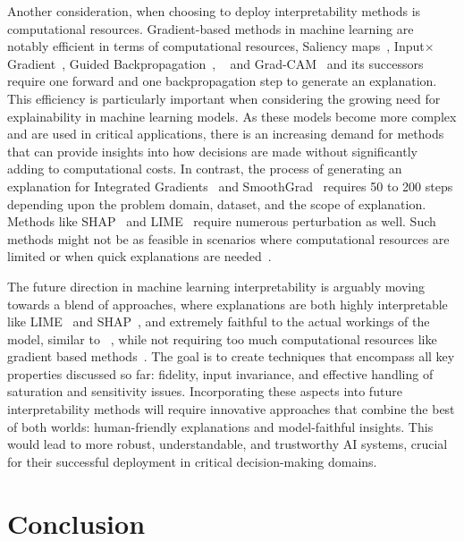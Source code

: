 Another consideration, when choosing to deploy interpretability methods is computational resources. Gradient-based methods in machine learning are notably efficient in terms of computational resources, Saliency maps~\cite{SimonyanVZ13}, Input$\times$Gradient~\cite{SimonyanVZ13}, Guided Backpropagation~\cite{SpringenbergDBR14}, \LRP~\cite{bach2015pixel} and  Grad-CAM~\cite{SelvarajuCDVPB20} and its successors~\cite{SelvarajuCDVPB20, ChattopadhyaySH18, abs-1908-01224, SmilkovTKVW17} require one forward and one backpropagation step to generate an explanation. This efficiency is particularly important when considering the growing need for explainability in machine learning models. As these models become more complex and are used in critical applications, there is an increasing demand for methods that can provide insights into how decisions are made without significantly adding to computational costs. In contrast, the process of generating an explanation for Integrated Gradients~\cite{SundararajanTY17} and SmoothGrad~\cite{SmilkovTKVW17} requires 50 to 200 steps depending upon the problem domain, dataset, and the scope of explanation. Methods like SHAP~\cite{LundbergL17} and LIME~\cite{Ribeiro0G16} require numerous perturbation as well. Such methods might not be as feasible in scenarios where computational resources are limited or when quick explanations are needed~\cite{GhorbaniAZ19}.


The future direction in machine learning interpretability is arguably moving towards a blend of approaches, where explanations are both highly interpretable like LIME~\cite{bach2015pixel} and SHAP~\cite{LundbergL17}, and extremely faithful to the actual workings of the model, similar to \LRP~\cite{bach2015pixel}, while not requiring too much computational resources like gradient based methods~\cite{SimonyanVZ13, SimonyanVZ13, SpringenbergDBR14, bach2015pixel, SelvarajuCDVPB20, SelvarajuCDVPB20, ChattopadhyaySH18, abs-1908-01224, SmilkovTKVW17}. The goal is to create techniques that encompass all key properties discussed so far: fidelity, input invariance, and effective handling of saturation and sensitivity issues. Incorporating these aspects into future interpretability methods will require innovative approaches that combine the best of both worlds:  human-friendly explanations and model-faithful insights. This would lead to more robust, understandable, and trustworthy AI systems, crucial for their successful deployment in critical decision-making domains.


\section{Conclusion}

